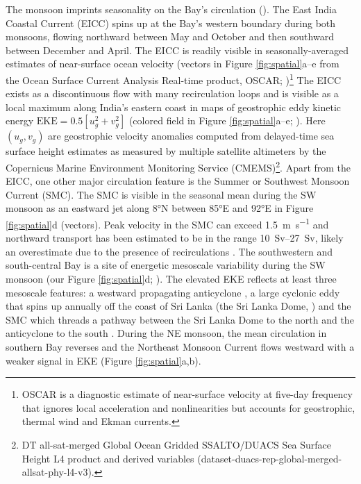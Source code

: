 \documentclass[onecol]{ametsoc}
\begin{document}
The monsoon imprints seasonality on the Bay's circulation (\citealp{Schott2002,Shankar2002}).
The East India Coastal Current (EICC) spins up at the Bay's western boundary during both monsoons, flowing northward between May and October and then southward between December and April.
The EICC is readily visible in seasonally-averaged estimates of near-surface ocean velocity (vectors in Figure \ref{fig:spatial}a--e from the Ocean Surface Current Analysis Real-time product, OSCAR; \citealp{Bonjean2002})\footnote{OSCAR is a diagnostic estimate of near-surface velocity at five-day frequency that ignores local acceleration and nonlinearities but accounts for geostrophic, thermal wind and Ekman currents.}
The EICC exists as a discontinuous flow with many recirculation loops and is visible as a local maximum along India's eastern coast in maps of geostrophic eddy kinetic energy \(\text{EKE} = 0.5[u_g^2 + v_g^2]\) (colored field in Figure \ref{fig:spatial}a--e; \citealp{Durand2009}).
Here \((u_g, v_g)\) are geostrophic velocity anomalies computed from delayed-time sea surface height estimates as measured by multiple satellite altimeters by the Copernicus Marine Environment Monitoring Service (CMEMS)\footnote{DT all-sat-merged Global Ocean Gridded SSALTO/DUACS Sea Surface Height L4 product and derived variables (dataset-duacs-rep-global-merged-allsat-phy-l4-v3).}. 
Apart from the EICC, one other major circulation feature is the Summer or Southwest Monsoon Current (SMC).
The SMC is visible in the seasonal mean during the SW monsoon as an eastward jet along 8°N between 85°E and 92°E in Figure \ref{fig:spatial}d (vectors).
Peak velocity in the SMC can exceed \SI{1.5}{\meter\per\second} and northward transport has been estimated to be in the range \SIrange{10}{27}{Sv}, likely an overestimate due to the presence of recirculations \citep{Wijesekera2016a,Vinayachandran1999,Webber2018}.
The southwestern and south-central Bay is a site of energetic mesoscale variability during the SW monsoon (our Figure \ref{fig:spatial}d; \citealp{Chen2018}).
The elevated EKE reflects at least three mesoscale features: a westward propagating anticyclone \citep{Wijesekera2016a}, a large cyclonic eddy that spins up annually off the coast of Sri Lanka (the Sri Lanka Dome, \citealp{Vinayachandran1998}) and the SMC which threads a pathway between the Sri Lanka Dome to the north and the anticyclone to the south \citep{Vinayachandran1999,Wijesekera2016a}.
During the NE monsoon, the mean circulation in southern Bay reverses and the Northeast Monsoon Current flows westward with a weaker signal in EKE (Figure \ref{fig:spatial}a,b).
\end{document}

